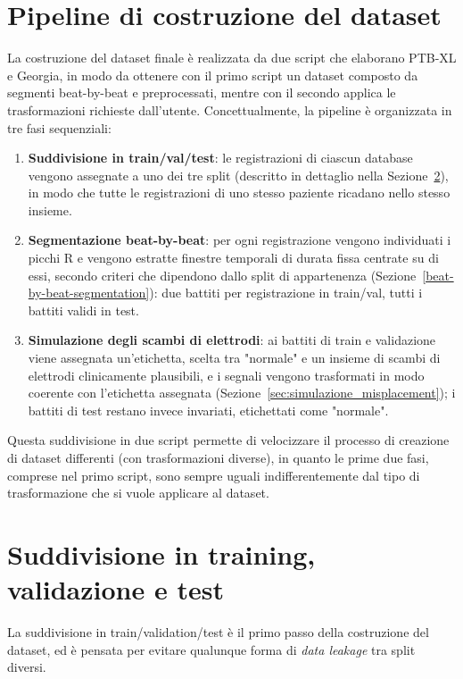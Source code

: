 \section{Pipeline di costruzione del dataset}
\label{sec:pipeline_overview}

La costruzione del dataset finale è realizzata da due script che elaborano PTB-XL e Georgia, in modo da ottenere con il primo script un dataset composto da segmenti beat-by-beat e preprocessati, mentre con il secondo applica le trasformazioni richieste dall'utente. Concettualmente, la pipeline è organizzata in tre fasi sequenziali:

\begin{enumerate}
	\item \textbf{Suddivisione in train/val/test}: le registrazioni di ciascun database vengono assegnate a uno dei tre split (descritto in dettaglio nella Sezione~\ref{sec:split}), in modo che tutte le registrazioni di uno stesso paziente ricadano nello stesso insieme.
	\item \textbf{Segmentazione beat-by-beat}: per ogni registrazione vengono individuati i picchi R e vengono estratte finestre temporali di durata fissa centrate su di essi, secondo criteri che dipendono dallo split di appartenenza (Sezione~\ref{beat-by-beat-segmentation}): due battiti per registrazione in train/val, tutti i battiti validi in test.
	\item \textbf{Simulazione degli scambi di elettrodi}: ai battiti di train e validazione viene assegnata un'etichetta, scelta tra "normale" e un insieme di scambi di elettrodi clinicamente plausibili, e i segnali vengono trasformati in modo coerente con l'etichetta assegnata (Sezione~\ref{sec:simulazione_misplacement}); i battiti di test restano invece invariati, etichettati come "normale".
\end{enumerate}

Questa suddivisione in due script permette di velocizzare il processo di creazione di dataset differenti (con trasformazioni diverse), in quanto le prime due fasi, comprese nel primo script, sono sempre uguali indifferentemente dal tipo di trasformazione che si vuole applicare al dataset.

\section{Suddivisione in training, validazione e test}
\label{sec:split}

La suddivisione in train/validation/test è il primo passo della costruzione del dataset, ed è pensata per evitare qualunque forma di \emph{data leakage} tra split diversi.


